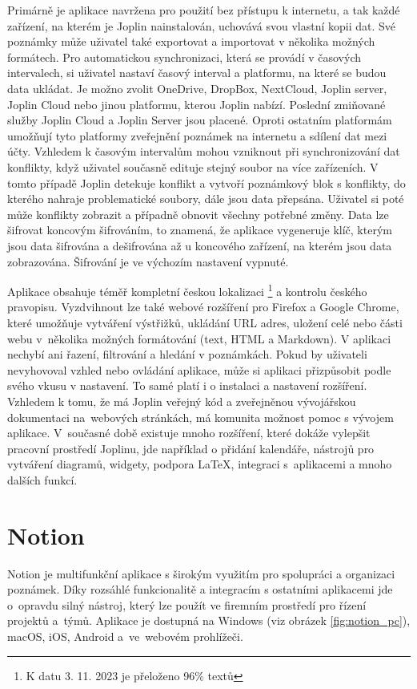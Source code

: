 \documentclass[czech, bc, kiv, he, iso690numb]{fasthesis}
\begin{document}
Primárně je aplikace navržena pro použití bez přístupu k internetu, a tak každé zařízení, na kterém je Joplin nainstalován, uchovává svou vlastní kopii dat. Své poznámky může uživatel také exportovat a importovat v několika možných formátech. Pro automatickou synchronizaci, která se provádí v časových intervalech, si uživatel nastaví časový interval a platformu, na které se budou data ukládat. Je možno zvolit OneDrive, DropBox, NextCloud, Joplin server, Joplin Cloud nebo jinou platformu, kterou Joplin nabízí. Poslední zmiňované služby Joplin Cloud a Joplin Server jsou placené. Oproti ostatním platformám umožňují tyto platformy zveřejnění poznámek na internetu a sdílení dat mezi účty. Vzhledem k časovým intervalům mohou vzniknout při synchronizování dat konflikty, když uživatel současně edituje stejný soubor na více zařízeních. V tomto případě Joplin detekuje konflikt a vytvoří poznámkový blok s konflikty, do kterého nahraje problematické soubory, dále jsou data přepsána. Uživatel si poté může konflikty zobrazit a případně obnovit všechny potřebné změny. Data lze šifrovat koncovým šifrováním, to znamená, že aplikace vygeneruje klíč, kterým jsou data šifrována a dešifrována až u koncového zařízení, na kterém jsou data zobrazována. Šifrování je ve výchozím nastavení vypnuté.

Aplikace obsahuje téměř kompletní českou lokalizaci \footnote{K datu 3. 11. 2023 je přeloženo 96$\%$ textů} a kontrolu českého pravopisu. Vyzdvihnout lze také webové rozšíření pro Firefox a Google Chrome, které umožňuje vytváření výstřižků, ukládání \gls{URL} adres, uložení celé nebo části webu v~několika možných formátování (text, \gls{HTML} a Markdown). V aplikaci nechybí ani řazení, filtrování a hledání v poznámkách. Pokud by uživateli nevyhovoval vzhled nebo ovládání aplikace, může si aplikaci přizpůsobit podle svého vkusu v nastavení. To samé platí i o instalaci a nastavení rozšíření. Vzhledem k tomu, že má Joplin veřejný kód a zveřejněnou vývojářskou dokumentaci na~webových stránkách, má komunita možnost pomoc s vývojem aplikace. V~současné době existuje mnoho rozšíření, které dokáže vylepšit pracovní prostředí Joplinu, jde například o přidání kalendáře, nástrojů pro vytváření diagramů, widgety, podpora \LaTeX, integraci s~aplikacemi a mnoho dalších funkcí.   

\section{Notion}

Notion je multifunkční aplikace s širokým využitím pro spolupráci a organizaci poznámek. Díky rozsáhlé funkcionalitě a integracím s ostatními aplikacemi jde o~opravdu silný nástroj, který lze použít ve firemním prostředí pro řízení projektů a~týmů. Aplikace je dostupná na Windows (viz obrázek \ref{fig:notion_pc}), macOS, iOS, Android a~ve~webovém prohlížeči. \cite{notion-help}
\end{document}
